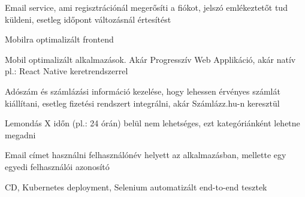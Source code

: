 \begin{compactitem}
    \item Email service, ami regisztrációnál megerősíti a fiókot, jelszó emlékeztetőt tud küldeni, esetleg időpont változásnál értesítést
    \item Mobilra optimalizált frontend
    \item Mobil optimalizált alkalmazások. Akár Progresszív Web Applikáció, akár natív pl.: React Native keretrendszerrel
    \item Adószám és számlázási információ kezelése, hogy lehessen érvényes számlát kiállítani, esetleg fizetési rendszert integrálni, akár Számlázz.hu-n keresztül
    \item Lemondás X időn (pl.: 24 órán) belül nem lehetséges, ezt kategóriánként lehetne megadni
    \item Email címet használni felhasználónév helyett az alkalmazásban, mellette egy egyedi felhasználói azonosító
    \item CD, Kubernetes deployment, Selenium automatizált end-to-end tesztek
\end{compactitem}



